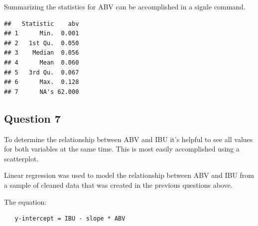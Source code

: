 \documentclass[]{article}
\newenvironment{Shaded}{\begin{snugshade}}{\end{snugshade}}
\newcommand{\KeywordTok}[1]{\textcolor[rgb]{0.13,0.29,0.53}{\textbf{#1}}}
\newcommand{\DataTypeTok}[1]{\textcolor[rgb]{0.13,0.29,0.53}{#1}}
\newcommand{\DecValTok}[1]{\textcolor[rgb]{0.00,0.00,0.81}{#1}}
\newcommand{\StringTok}[1]{\textcolor[rgb]{0.31,0.60,0.02}{#1}}
\newcommand{\CommentTok}[1]{\textcolor[rgb]{0.56,0.35,0.01}{\textit{#1}}}
\newcommand{\OperatorTok}[1]{\textcolor[rgb]{0.81,0.36,0.00}{\textbf{#1}}}
\newcommand{\NormalTok}[1]{#1}
\begin{document}
Summarizing the statistics for ABV can be accomplished in a signle
command.

\begin{Shaded}
\end{Shaded}

\begin{verbatim}
##   Statistic    abv
## 1      Min.  0.001
## 2   1st Qu.  0.050
## 3    Median  0.056
## 4      Mean  0.060
## 5   3rd Qu.  0.067
## 6      Max.  0.128
## 7      NA's 62.000
\end{verbatim}

\subsection{Question 7}\label{question-7}

To determine the relationship between ABV and IBU it's helpful to see
all values for both variables at the same time. This is most easily
accomplished using a scatterplot.

Linear regression was used to model the relationship between ABV and IBU
from a sample of cleaned data that was created in the previous questions
above.

The equation:

\begin{verbatim}
   y-intercept = IBU - slope * ABV       
\end{verbatim}
\end{document}
